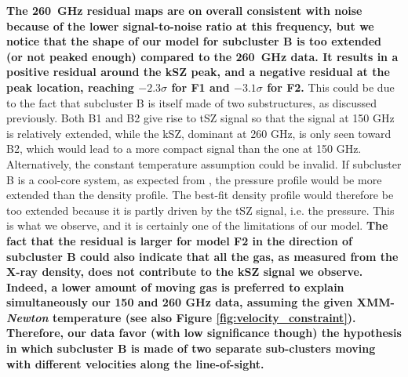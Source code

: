 \documentclass[twocolumn,traditabstract]{aa}
\begin{document}
{\bf The 260~GHz residual maps are on overall consistent with noise because of the lower signal-to-noise ratio at this frequency, but we notice that the shape of our model for subcluster B is too extended (or not peaked enough) compared to the 260~GHz data. It results in a positive residual around the kSZ peak, and a negative residual at the peak location, reaching $-2.3 \sigma$ for F1 and $-3.1 \sigma$ for F2.} This could be due to the fact that subcluster B is itself made of two substructures, as discussed previously. Both B1 and B2 give rise to tSZ signal so that the signal at 150 GHz is relatively extended, while the kSZ, dominant at 260 GHz, is only seen toward B2, which would lead to a more compact signal than the one at 150 GHz. Alternatively, the constant temperature assumption could be invalid. If subcluster B is a cool-core system, as expected from \cite{Ma2009}, the pressure profile would be more extended than the density profile. The best-fit density profile would therefore be too extended because it is partly driven by the tSZ signal, i.e. the pressure. This is what we observe, and it is certainly one of the limitations of our model. {\bf The fact that the residual is larger for model F2 in the direction of subcluster B could also indicate that all the gas, as measured from the X-ray density, does not contribute to the kSZ signal we observe. Indeed, a lower amount of moving gas is preferred to explain simultaneously our 150 and 260 GHz data, assuming the given XMM-\textit{Newton} temperature (see also Figure \ref{fig:velocity_constraint}). Therefore, our data favor (with low significance though) the hypothesis in which subcluster B is made of two separate sub-clusters moving with different velocities along the line-of-sight.}
\end{document}
